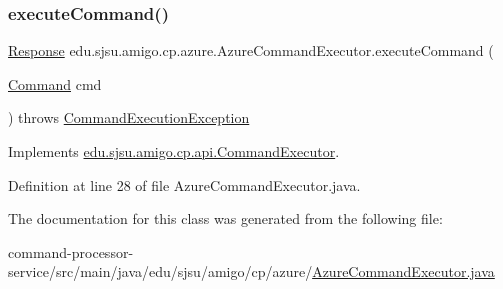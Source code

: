 \subsubsection{\texorpdfstring{execute\+Command()}{executeCommand()}}
{\footnotesize\ttfamily \hyperlink{classedu_1_1sjsu_1_1amigo_1_1cp_1_1api_1_1_response}{Response} edu.\+sjsu.\+amigo.\+cp.\+azure.\+Azure\+Command\+Executor.\+execute\+Command (\begin{DoxyParamCaption}\item[{\hyperlink{classedu_1_1sjsu_1_1amigo_1_1cp_1_1api_1_1_command}{Command}}]{cmd }\end{DoxyParamCaption}) throws \hyperlink{classedu_1_1sjsu_1_1amigo_1_1cp_1_1api_1_1_command_execution_exception}{Command\+Execution\+Exception}}



Implements \hyperlink{interfaceedu_1_1sjsu_1_1amigo_1_1cp_1_1api_1_1_command_executor_af1e217a4347a1f1e8e2d0d465b94a662}{edu.\+sjsu.\+amigo.\+cp.\+api.\+Command\+Executor}.



Definition at line 28 of file Azure\+Command\+Executor.\+java.



The documentation for this class was generated from the following file\+:\begin{DoxyCompactItemize}
\item 
command-\/processor-\/service/src/main/java/edu/sjsu/amigo/cp/azure/\hyperlink{_azure_command_executor_8java}{Azure\+Command\+Executor.\+java}\end{DoxyCompactItemize}
